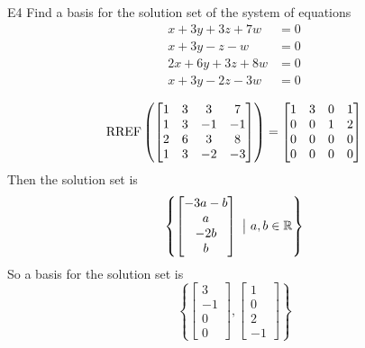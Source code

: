 \documentclass{sbgLAquiz}
\begin{document}
\begin{extract}\newpage\end{extract}
\begin{problem}{E4} 
Find a basis for the solution set of the system of equations
\begin{align*}
x+3y+3z+7w &= 0 \\
 x+3y-z-w &= 0 \\
  2x+6y+3z+8w &= 0 \\
   x+3y-2z-3w &= 0
\end{align*}
\end{problem}
\begin{solution}
$$\operatorname{RREF}\left(\begin{bmatrix} 1 & 3 & 3 & 7 \\ 1 & 3 & -1 & -1 \\ 2 & 6 & 3 & 8 \\ 1 & 3 & -2 & -3 \end{bmatrix}\right) = \begin{bmatrix} 1 & 3 & 0 & 1 \\ 0 & 0 & 1 & 2 \\ 0 & 0 & 0 & 0 \\ 0 & 0 & 0 & 0 \end{bmatrix}$$
Then the solution set is 
$$\left\{ \begin{bmatrix} -3a-b \\ a \\ -2b \\ b \end{bmatrix}\ \big|\ a,b \in \mathbb{R}\right\}$$
So a basis for the solution set is $$ \left\{ \begin{bmatrix} 3 \\ -1 \\ 0 \\ 0 \end{bmatrix} , \begin{bmatrix} 1\\0 \\ 2 \\ -1 \end{bmatrix} \right\} $$
\end{solution}
\end{document}
